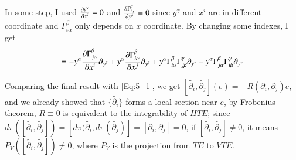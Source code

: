 \documentclass[a4paper, 12pt]{article}
\theoremstyle{Mydefinition}
\theoremstyle{Mytheorem}
\begin{document}
In some step, I used $\pdv{y^\gamma}{x^i} = 0$ and $\pdv{\Gamma_{i\alpha}^\beta}{y^\delta} = 0$ since $y^\gamma$ and $x^i$ are in different coordinate and $\Gamma_{i\alpha}^\beta$ only depends on $x$ coordinate. By changing some indexes, I get
\begin{equation*}
    [\tilde{\partial_i}, \tilde{\partial_j}]=-y^\alpha \pdv{\Gamma^\beta_{j\alpha}}{x^i}\partial_{y^\beta} + y^\alpha \pdv{\Gamma^\beta_{i\alpha}}{x^j}\partial_{y^\beta} + y^\alpha \Gamma^\beta_{i\alpha} \Gamma_{j\beta}^\gamma\partial_{y^\gamma}-y^\alpha \Gamma^\beta_{j\alpha} \Gamma_{i\beta}^\gamma\partial_{y^\gamma}
\end{equation*}

Comparing the final result with \eqref{Eq:5_1}, we get $[\tilde{\partial_i}, \tilde{\partial_j}](e) = -R(\partial_i, \partial_j)e$, and we already showed that $\{\tilde{\partial_i}\}$ forms a local section near $e$, by Frobenius theorem, $R\equiv 0$ is equivalent to the integrability of $HTE$; since $d\pi([\tilde{\partial_i}, \tilde{\partial_j}]) = [d\pi(\tilde{\partial_i}, d\pi(\tilde{\partial_j})] = [\partial_i, \partial_j] = 0$, if $[\tilde{\partial_i}, \tilde{\partial_j}]\neq 0$, it means $P_V([\tilde{\partial_i}, \tilde{\partial_j}])\neq 0$, where $P_V$ is the projection from $TE$ to $VTE$.\\
\end{document}
